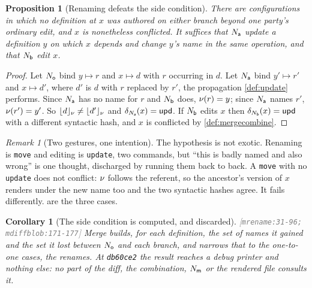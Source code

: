 \documentclass[11pt]{article}
\theoremstyle{definition}
\theoremstyle{plain}
\newtheorem{corollary}{Corollary}[section]
\newtheorem{proposition}{Proposition}[section]
\theoremstyle{remark}
\newtheorem{remark}{Remark}[section]
\newcommand{\src}[1]{{\footnotesize\textcolor{gray}{[\texttt{#1}]}}}
\begin{document}
\begin{proposition}[Renaming defeats the side condition]\label{prop:rename-conflict}
There are configurations in which no definition at $x$ was authored on either branch beyond one
party's ordinary edit, and $x$ is nonetheless conflicted. It suffices that $N_{\mathsf{a}}$ update a definition
$y$ on which $x$ depends and change $y$'s name in the same operation, and that $N_{\mathsf{b}}$ edit $x$.
\end{proposition}
\begin{proof}
Let $N_{\mathsf{o}}$ bind $y \mapsto r$ and $x \mapsto d$ with $r$ occurring in $d$. Let $N_{\mathsf{a}}$ bind
$y' \mapsto r'$ and $x \mapsto d'$, where $d'$ is $d$ with $r$ replaced by $r'$, the propagation
\cref{def:update} performs. Since $N_{\mathsf{a}}$ has no name for $r$ and $N_{\mathsf{b}}$ does, $\nu(r) = y$; since
$N_{\mathsf{a}}$ names $r'$, $\nu(r') = y'$. So $\lfloor d \rfloor_{\nu} \neq \lfloor d' \rfloor_{\nu}$ and
$\delta_{N_{\mathsf{a}}}(x) = \mathsf{upd}$. If $N_{\mathsf{b}}$ edits $x$ then $\delta_{N_{\mathsf{b}}}(x) = \mathsf{upd}$ with a different
syntactic hash, and $x$ is conflicted by \cref{def:mergecombine}.
\end{proof}

\begin{remark}[Two gestures, one intention]\label{rem:rename-gesture}
The hypothesis is not exotic. Renaming is \texttt{move} and editing is \texttt{update}, two commands,
but ``this is badly named and also wrong'' is one thought, discharged by running them back to back. A
\texttt{move} with no \texttt{update} does not conflict: $\nu$ follows the referent, so the
ancestor's version of $x$ renders under the new name too and the two syntactic hashes agree. It fails
differently.  are the three cases.
\end{remark}

\begin{corollary}[The side condition is computed, and discarded]\label{cor:unchecked}
\src{mrename:31-96; mdiffblob:171-177} Merge builds, for each definition, the set of names it gained
and the set it lost between $N_{\mathsf{o}}$ and each branch, and narrows that to the one-to-one cases, the
renames. At \texttt{db60ce2} the result reaches a debug printer and nothing else: no part of the diff,
the combination, $N_{\mathsf{m}}$ or the rendered file consults it.
\end{corollary}
\end{document}
